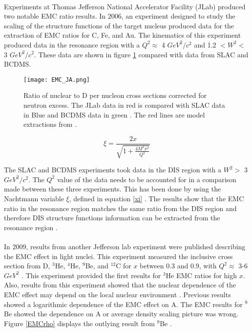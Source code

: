 \paragraph{}Experiments at Thomas Jefferson National Accelerator Facility (JLab) produced two notable EMC ratio results. In 2006, an experiment designed to study the scaling of the structure functions of the target nucleus produced data for the extraction of EMC ratios for C, Fe, and Au. The kinematics of this experiment produced data in the resonance region with a $Q^2 \approx$ 4 $GeV^2/c^2$ and 1.2 $ < W^2 < $ 3 $GeV^2/c^2$. These data are shown in figure \ref{fig:EMCJA} compared with data from SLAC and BCDMS. 
\begin{figure}[]
	\centering
	\texttt{[image: EMC\_JA.png]} 
	\caption{Ratio of nuclear to D per nucleon cross sections corrected for neutron excess\cite{EMC_JA}. The JLab data in red is compared with SLAC data in Blue \cite{gomez} and BCDMS data in green \cite{BCDMS}. The red lines are model extractions from \cite{jlab_arr_model}.}
	\label{fig:EMCJA}
\end{figure} 
\begin{equation}
\xi = \frac{2x}{\sqrt{1 + \frac{4M^2x^2}{Q^2}}} \label{xi}
\end{equation}

The SLAC and BCDMS experiments took data in the DIS region with a $W^2 > $ 3 $GeV^2/c^2$. The $Q^2$ value of the data needs to be accounted for in a comparison made between these three experiments. This has been done by using the Nachtmann variable $\xi$, defined in equation \ref{xi} \cite{EMC_JA}. The results show that the EMC ratio in the resonance region matches the same ratio from the DIS region and therefore DIS structure functions information can be extracted from the resonance region \cite{seelyth}. 
\paragraph{}In 2009, results from another Jefferson lab experiment were published describing the EMC effect in light nuclei. This experiment measured the inclusive cross section from D, $^3$He, $^4$He, $^9$Be, and $^{12}$C for $x$ between 0.3 and 0.9, with $Q^2 \approx$ 3-6 $GeV^2$ \cite{seeley}.  This experiment provided the first results for $^3$He EMC ratios for high $x$.  Also, results from this experiment showed that the nuclear dependence of the EMC effect may depend on the local nuclear environment \cite{seeley}. Previous results showed a logarithmic dependence of the EMC effect on A. The EMC results for $^9$Be showed the dependence on A or average density scaling picture was wrong. Figure \ref{EMCrho}  displays the outlying result from $^9$Be \cite{seeley}.

